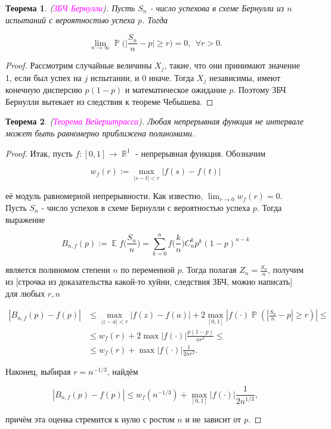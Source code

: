 \documentclass[a4paper,100pt]{article}
\theoremstyle{indented}
\newtheorem{theorem}{Теорема}
\theoremstyle{definition}
\theoremstyle{remark}
\DeclareMathOperator{\ra}{\rightarrow}
\DeclareMathOperator{\RR}{\mathbb{R}}
\DeclareMathOperator{\PP}{\mathbb{P}}
\DeclareMathOperator{\EE}{\mathbb{E}}
\begin{document}
\begin{theorem}
  (\hypertarget{n22}{\textcolor{magenta}{\textit{ЗБЧ Бернулли}}}). Пусть $S_n$ - число успехова в схеме Бернулли из $n$ испытаний с вероятностью успеха $p$. Тогда 

  \[
    \lim_{n \ra \infty} \PP \biggl( \bigg| \frac{S_n}{n} - p \bigg| \geq r \biggr) = 0, \: \: \forall r >0. 
  \]
\end{theorem}

\begin{proof}
  Рассмотрим случайные величины $X_j$, такие, что они принимают значение 1, если был успех на $j$ испытании, и 0 иначе. Тогда $X_j$ независимы, имеют конечную дисперсию $p(1-p)$ и математическое ожидание $p$. Поэтому ЗБЧ Бернулли вытекает из следствия к теореме Чебышева.
\end{proof}

\begin{theorem}
  (\hypertarget{n23}{\textcolor{magenta}{\textit{Теорема Вейерштрасса}}}). Любая непрерывная функция не интервале может быть равномерно приближена полиномами.
\end{theorem}

\begin{proof}
  Итак, пусть $f: [0, 1] \ra \RR^1$ - непрерывная функция. Обозначим

  \[
    w_f(r) := \max_{|s-t|<r} |f(s) - f(t)| 
  \]

  её модуль равномерной непрерывности. Как известно, $\lim_{r \ra 0} w_f(r) = 0$. Пусть $S_n$ - число успехов в схеме Бернулли с вероятностью успеха $p$. Тогда выражение 

  \[
    B_{n, f}(p) := \EE f \biggl(\frac{S_n}{n} \biggr) = \sum_{k=0}^n f \biggl( \frac{k}{n} \biggr) C_n^k p^k (1-p)^{n-k}
  \]

  является полиномом степени $n$ по переменной $p$. Тогда полагая $Z_n = \frac{S_n}{n}$, получим из [строчка из доказательства какой-то хуйни, следствия ЗБЧ, можно написать] для любых $r, n$ 

  \begin{equation*}
    \begin{aligned}
      |B_{n, f}(p)-f(p)| & \leq \max_{|z-a|<r}|f(z)-f(a)|+2\max_{[0, 1]}|f(\cdot) \PP(|\frac{S_n}{n}-p|\geq r)| \leq \\
      & \leq w_f(r)+ 2\max |f(\cdot)| \frac{p(1-p)}{nr^2} \leq \\
      & \leq w_f(r)+\max |f(\cdot)| \frac{1}{2nr^2}. 
    \end{aligned}
  \end{equation*}

  Наконец, выбирая $r=n^{-1/3}$, найдём

  \[
    |B_{n, f}(p)-f(p)|\leq w_f(n^{-1/3})+\max_{[0, 1]}|f(\cdot)| \frac{1}{2n^{1/3}}, 
  \]

  причём эта оценка стремится к нулю с ростом $n$ и не зависит от $p$. 

\end{proof}
\end{document}
